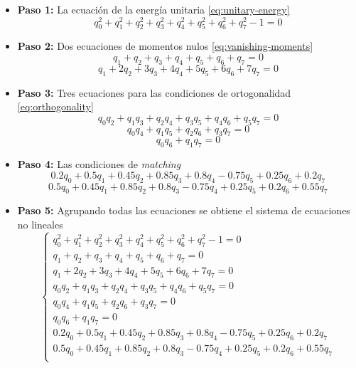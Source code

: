 \begin{itemize}
	\item \textbf{Paso 1:} La ecuación de la energía unitaria \ref{eq:unitary-energy}
		\begin{equation}
			q_0^2 + q_1^2 + q_2^2 + q_3^2 + q_4^2 + q_5^2 + q_6^2 + q_7^2 - 1 = 0
		\end{equation}
	\item \textbf{Paso 2:} Dos ecuaciones de momentos nulos \ref{eq:vanishing-moments}
		\begin{equation}
			q_1 + q_2 + q_3 + q_4 + q_5 + q_6 + q_7  = 0
		\end{equation}
		\begin{equation}
			q_1 + 2q_2 + 3q_3 + 4q_4 + 5q_5 + 6q_6 + 7q_7 = 0
		\end{equation}
	\item \textbf{Paso 3:} Tres ecuaciones para las condiciones de ortogonalidad \ref{eq:orthogonality}
		\begin{equation}
			q_0q_2 + q_1q_3 + q_2q_4 + q_3q_5 + q_4q_6 + q_5q_7 = 0
		\end{equation}
		\begin{equation}
			q_0q_4 + q_1q_5 + q_2q_6 + q_3q_7 = 0
		\end{equation}
		\begin{equation}
			q_0q_6 + q_1q_7 = 0
		\end{equation}
	\item \textbf{Paso 4:} Las condiciones de \textit{matching} 
		\begin{equation}
			0.2q_0 + 0.5q_1 + 0.45q_2 + 0.85q_3 + 0.8q_4 - 0.75q_5 + 0.25q_6 + 0.2q_7
		\end{equation}
		\begin{equation}
			0.5q_0 + 0.45q_1 + 0.85q_2 + 0.8q_3 - 0.75q_4 + 0.25q_5 + 0.2q_6 + 0.55q_7
		\end{equation}
	\item \textbf{Paso 5:} Agrupando todas las ecuaciones se obtiene el sistema de ecuaciones no lineales
		\begin{equation}\label{eq:system}
			\left\{ \begin{array}{rcl}
						q_0^2 + q_1^2 + q_2^2 + q_3^2 + q_4^2 + q_5^2 + q_6^2 + q_7^2 - 1 = 0 \\
						q_1 + q_2 + q_3 + q_4 + q_5 + q_6 + q_7  = 0 \\
						q_1 + 2q_2 + 3q_3 + 4q_4 + 5q_5 + 6q_6 + 7q_7 = 0 \\
						q_0q_2 + q_1q_3 + q_2q_4 + q_3q_5 + q_4q_6 + q_5q_7 = 0 \\
						q_0q_4 + q_1q_5 + q_2q_6 + q_3q_7 = 0 \\
						q_0q_6 + q_1q_7 = 0 \\
						0.2q_0 + 0.5q_1 + 0.45q_2 + 0.85q_3 + 0.8q_4 - 0.75q_5 + 0.25q_6 + 0.2q_7 \\
						0.5q_0 + 0.45q_1 + 0.85q_2 + 0.8q_3 - 0.75q_4 + 0.25q_5 + 0.2q_6 + 0.55q_7 \\
					\end{array}
				\right.
			\end{equation}
\end{itemize}

